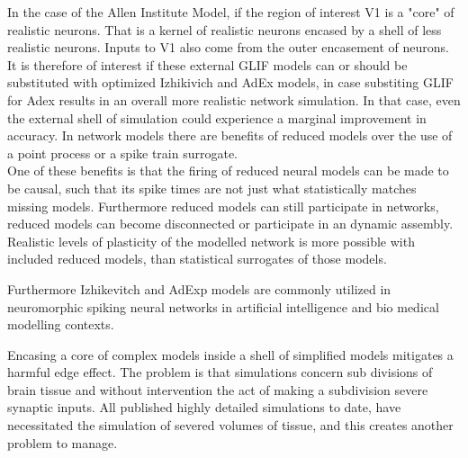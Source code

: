 In the case of the Allen Institute Model, if the region of interest V1 is a "core" of realistic neurons. That is a kernel of realistic neurons encased by a shell of less realistic neurons. Inputs to V1 also come from the outer encasement of neurons. It is therefore of interest if these external GLIF models can or should be substituted with optimized Izhikivich and AdEx models, in case substiting GLIF for Adex results in an overall more realistic network simulation. In that case, even the external shell of simulation could experience a marginal improvement in accuracy. In network models there are benefits of reduced models over the use of a point process or a spike train surrogate.\\


One of these benefits is that the firing of reduced neural models can be made to be causal, such that its spike times are not just what statistically matches missing models. Furthermore reduced models can still participate in networks, reduced models can become disconnected or participate in an dynamic assembly. Realistic levels of plasticity of the modelled network is more possible with included reduced models, than statistical surrogates of those models.

Furthermore Izhikevitch and AdExp models are commonly utilized in neuromorphic spiking neural networks in artificial intelligence and bio medical modelling contexts.

Encasing a core of complex models inside a shell of simplified models mitigates a harmful edge effect. The problem is that simulations concern sub divisions of brain tissue and without intervention the act of making a subdivision severe synaptic inputs. All published highly detailed simulations to date, have necessitated the simulation of severed volumes of tissue, and this creates another problem to manage.\\